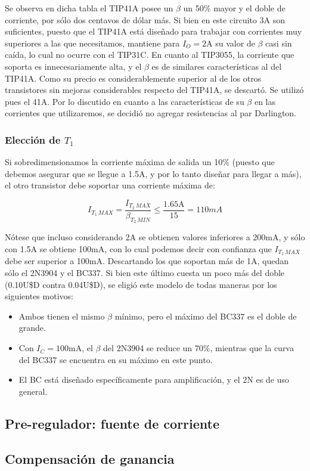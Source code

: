 \documentclass[e2_tp1_main.tex]{subfiles}
\begin{document}
Se observa en dicha tabla el TIP41A posee un $\beta$ un 50\% mayor y el doble de corriente, por s\'olo dos centavos de d\'olar m\'as. Si bien en este circuito 3A son suficientes, puesto que el TIP41A est\'a dise\~nado para trabajar con corrientes muy superiores a las que necesitamos, mantiene para $I_{O} = 2$A su valor de $\beta$ casi sin ca\'ida, lo cual no ocurre con el TIP31C. En cuanto al TIP3055, la corriente que soporta es innecesariamente alta, y el $\beta$ es de similares caracter\'isticas al del TIP41A. Como su precio es considerablemente superior al de los otros transistores sin mejoras considerables respecto del TIP41A, se descart\'o. Se utiliz\'o pues el 41A. Por lo discutido en cuanto a las caracter\'isticas de su $\beta$ en las corrientes que utilizaremos, se decidi\'o no agregar resistencias al par Darlington.


\subsubsection{Elecci\'on de $T_1$}

Si sobredimensionamos la corriente m\'axima de salida un 10\% (puesto que debemos asegurar que se llegue a 1.5A, y por lo tanto dise\~nar para llegar a m\'as), el otro transistor debe soportar una corriente m\'axima de:

\[I_{T_1\, MAX} = 
\frac{I_{T_2\, MAX}}{\beta_{T_2\,MIN}} \leq
\frac{1.65\mathrm{A}}{15} = 110mA \]

N\'otese que incluso considerando 2A se obtienen valores inferiores a 200mA, y s\'olo con 1.5A se obtiene 100mA, con lo cual podemos decir con confianza que $I_{T_1\, MAX}$ debe ser superior a 100mA. Descartando los que soportan m\'as de 1A, quedan s\'olo el 2N3904 y el BC337. Si bien este \'ultimo cuesta un poco m\'as del doble (0.10U\$D contra 0.04U\$D), se eligi\'o este modelo de todas maneras por los siguientes motivos:

\begin{itemize}
	\item Ambos tienen el mismo $\beta$ m\'inimo, pero el m\'aximo del BC337 es el doble de grande.
	\item Con $I_C = 100$mA, el $\beta$ del 2N3904 se reduce un 70\%, mientras que la curva del BC337 se encuentra en su m\'aximo en este punto.
	\item El BC est\'a dise\~nado espec\'ificamente para amplificaci\'on, y el 2N es de uso general.
\end{itemize}

  


\subsection{Pre-regulador: fuente de corriente}






\subsection{Compensaci\'on de ganancia}
\end{document}
